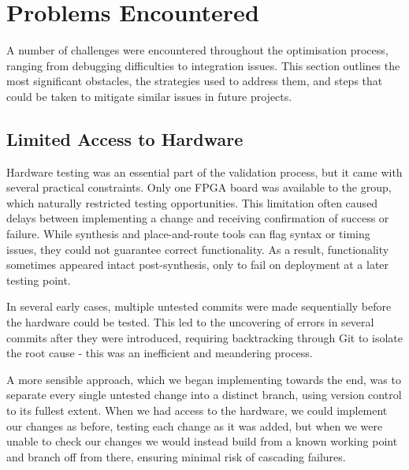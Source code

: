 \documentclass[a4paper,10pt]{article}
\begin{document}
\section{Problems Encountered}
\label{sec:Problems_Encountered}

A number of challenges were encountered throughout the optimisation process, 
ranging from debugging difficulties to integration issues. 
This section outlines the most significant obstacles, 
the strategies used to address them, 
and steps that could be taken to mitigate similar issues in future projects.

\subsection*{Limited Access to Hardware}

Hardware testing was an essential part of the validation process, 
but it came with several practical constraints. 
Only one FPGA board was available to the group, 
which naturally restricted testing opportunities. 
This limitation often caused delays between 
implementing a change and receiving confirmation of success or failure. 
While synthesis and place-and-route tools can flag syntax or timing issues, 
they could not guarantee correct functionality. 
As a result, functionality sometimes appeared intact post-synthesis, 
only to fail on deployment at a later testing point. 

In several early cases, multiple untested commits were made sequentially 
before the hardware could be tested. 
This led to the uncovering of errors in several commits 
after they were introduced, requiring backtracking through Git 
to isolate the root cause - 
this was an inefficient and meandering process.

A more sensible approach, which we began implementing towards the end,
was to separate every single untested change into a distinct branch,
using version control to its fullest extent.
When we had access to the hardware, we could implement our changes as before,
testing each change as it was added,
but when we were unable to check our changes 
we would instead build from a known working point and branch off from there, 
ensuring minimal risk of cascading failures.
\end{document}

